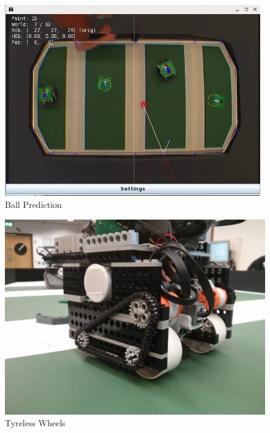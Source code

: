 \documentclass[a4paper,11pt]{article}
\begin{document}
\begin{figure}[p]
    \centering
    \includegraphics[width=110mm]{system2.jpg}
    \caption{Ball Prediction}
\end{figure}

\begin{figure}[p]
    \centering
    \includegraphics[width=130mm]{wheels-image.jpg}
    \caption{Tyreless Wheels}
\end{figure}
\end{document}
